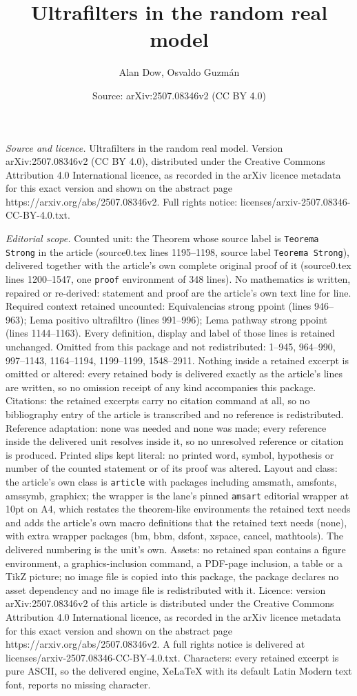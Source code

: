 \documentclass[10pt,a4paper]{amsart}
\title[Ultrafilters in the random real model]{Ultrafilters in the random real model}
\author{Alan Dow, Osvaldo Guzm\'an}
\date{Source: arXiv:2507.08346v2 (CC BY 4.0)}
\begin{document}
\maketitle

\noindent\emph{Source and licence.} Ultrafilters in the random real model. Version arXiv:2507.08346v2 (CC BY 4.0), distributed under the Creative Commons Attribution 4.0 International licence, as recorded in the arXiv licence metadata for this exact version and shown on the abstract page https://arxiv.org/abs/2507.08346v2. Full rights notice: licenses/arxiv-2507.08346-CC-BY-4.0.txt.\par\smallskip

\noindent\textit{Editorial scope.} Counted unit: the Theorem whose source label is \texttt{Teorema Strong} in the article (source0.tex lines 1195--1198, source label \texttt{Teorema Strong}), delivered together with the article's own complete original proof of it (source0.tex lines 1200--1547, one \texttt{proof} environment of 348 lines). No mathematics is written, repaired or re-derived: statement and proof are the article's own text line for line. Required context retained uncounted: Equivalencias strong ppoint (lines 946--963); Lema positivo ultrafiltro (lines 991--996); Lema pathway strong ppoint (lines 1144--1163). Every definition, display and label of those lines is retained unchanged. Omitted from this package and not redistributed: 1--945, 964--990, 997--1143, 1164--1194, 1199--1199, 1548--2911. Nothing inside a retained excerpt is omitted or altered: every retained body is delivered exactly as the article's lines are written, so no omission receipt of any kind accompanies this package. Citations: the retained excerpts carry no citation command at all, so no bibliography entry of the article is transcribed and no reference is redistributed. Reference adaptation: none was needed and none was made; every reference inside the delivered unit resolves inside it, so no unresolved reference or citation is produced. Printed slips kept literal: no printed word, symbol, hypothesis or number of the counted statement or of its proof was altered. Layout and class: the article's own class is \texttt{article} with packages including amsmath, amsfonts, amssymb, graphicx; the wrapper is the lane's pinned \texttt{amsart} editorial wrapper at 10pt on A4, which restates the theorem-like environments the retained text needs and adds the article's own macro definitions that the retained text needs (none), with extra wrapper packages (bm, bbm, dsfont, xspace, cancel, mathtools). The delivered numbering is the unit's own. Assets: no retained span contains a figure environment, a graphics-inclusion command, a PDF-page inclusion, a table or a TikZ picture; no image file is copied into this package, the package declares no asset dependency and no image file is redistributed with it. Licence: version arXiv:2507.08346v2 of this article is distributed under the Creative Commons Attribution 4.0 International licence, as recorded in the arXiv licence metadata for this exact version and shown on the abstract page https://arxiv.org/abs/2507.08346v2. A full rights notice is delivered at licenses/arxiv-2507.08346-CC-BY-4.0.txt. Characters: every retained excerpt is pure ASCII, so the delivered engine, XeLaTeX with its default Latin Modern text font, reports no missing character.
\end{document}
